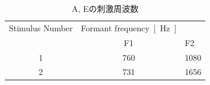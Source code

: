 \documentclass[main]{subfiles}
\begin{document}
\newpage
{}
\begin{table}[H]
  \caption{A, Eの刺激周波数}\label{tab:ae}
  \centering
    \begin{tabular}{c|cl}
      Stimulus Number & Formant frequency\SI{}{[\hertz]} \\
          & F1 & F2 \\ \hline
      1 & 760 & 1080 \\
      2 & 731 & 1656\\
    \end{tabular}
\end{table}
\end{document}
